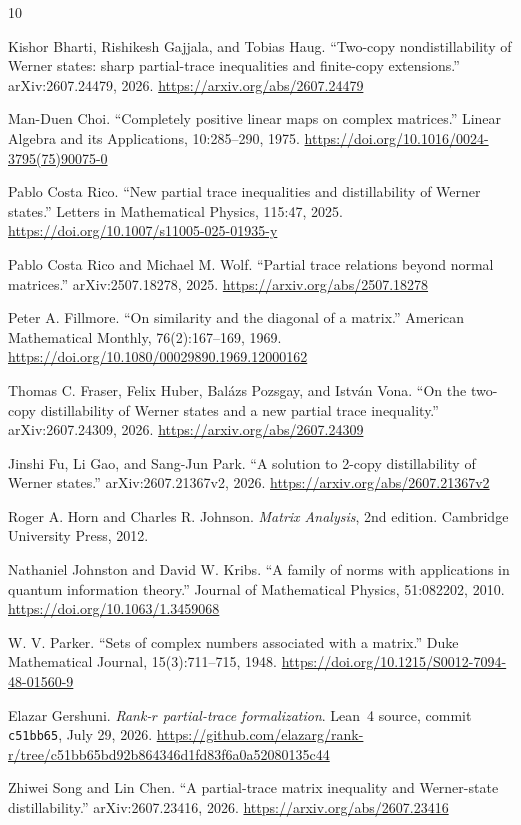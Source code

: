 \documentclass[11pt,reqno]{amsart}
\theoremstyle{remark}
\begin{document}
\begin{thebibliography}{10}

Kishor Bharti, Rishikesh Gajjala, and Tobias Haug.
``Two-copy nondistillability of Werner states: sharp partial-trace
inequalities and finite-copy extensions.''
\newblock arXiv:2607.24479, 2026.
\newblock \url{https://arxiv.org/abs/2607.24479}

Man-Duen Choi.
``Completely positive linear maps on complex matrices.''
\newblock Linear Algebra and its Applications, 10:285--290, 1975.
\newblock \url{https://doi.org/10.1016/0024-3795(75)90075-0}

Pablo Costa Rico.
``New partial trace inequalities and distillability of Werner states.''
\newblock Letters in Mathematical Physics, 115:47, 2025.
\newblock \url{https://doi.org/10.1007/s11005-025-01935-y}

Pablo Costa Rico and Michael M. Wolf.
``Partial trace relations beyond normal matrices.''
\newblock arXiv:2507.18278, 2025.
\newblock \url{https://arxiv.org/abs/2507.18278}

Peter A. Fillmore.
``On similarity and the diagonal of a matrix.''
\newblock American Mathematical Monthly, 76(2):167--169, 1969.
\newblock \url{https://doi.org/10.1080/00029890.1969.12000162}

Thomas C. Fraser, Felix Huber, Bal\'azs Pozsgay, and Istv\'an Vona.
``On the two-copy distillability of Werner states and a new partial trace
inequality.''
\newblock arXiv:2607.24309, 2026.
\newblock \url{https://arxiv.org/abs/2607.24309}

Jinshi Fu, Li Gao, and Sang-Jun Park.
``A solution to 2-copy distillability of Werner states.''
\newblock arXiv:2607.21367v2, 2026.
\newblock \url{https://arxiv.org/abs/2607.21367v2}

Roger A. Horn and Charles R. Johnson.
\newblock \emph{Matrix Analysis}, 2nd edition.
\newblock Cambridge University Press, 2012.

Nathaniel Johnston and David W. Kribs.
``A family of norms with applications in quantum information theory.''
\newblock Journal of Mathematical Physics, 51:082202, 2010.
\newblock \url{https://doi.org/10.1063/1.3459068}

W. V. Parker.
``Sets of complex numbers associated with a matrix.''
\newblock Duke Mathematical Journal, 15(3):711--715, 1948.
\newblock \url{https://doi.org/10.1215/S0012-7094-48-01560-9}

Elazar Gershuni.
\newblock \emph{Rank-$r$ partial-trace formalization}.
\newblock Lean~4 source, commit \texttt{c51bb65}, July 29, 2026.
\newblock
\url{https://github.com/elazarg/rank-r/tree/c51bb65bd92b864346d1fd83f6a0a52080135c44}

Zhiwei Song and Lin Chen.
``A partial-trace matrix inequality and Werner-state distillability.''
\newblock arXiv:2607.23416, 2026.
\newblock \url{https://arxiv.org/abs/2607.23416}

\end{thebibliography}
\end{document}
